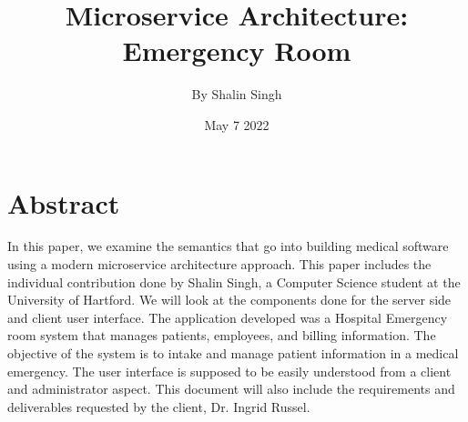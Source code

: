 \documentclass{article}
\title{Microservice Architecture: Emergency Room}
\author{By Shalin Singh}
\date{May 7 2022}
\begin{document}
\maketitle

\section{Abstract}
In this paper, we examine the semantics that go into building medical software using a modern microservice architecture approach. This paper includes the individual contribution done by Shalin Singh, a Computer Science student at the University of Hartford. We will look at the components done for the server side and client user interface. The application developed was a Hospital Emergency room system that manages patients, employees, and billing information. The objective of the system is to intake and manage patient information in a medical emergency. The user interface is supposed to be easily understood from a client and administrator aspect. This document will also include the requirements and deliverables requested by the client, Dr. Ingrid Russel.  
\end{document}
